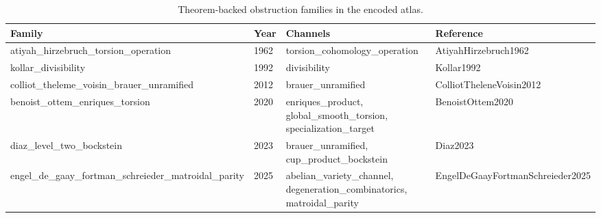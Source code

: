 \begin{table}[h]
\centering
\caption{Theorem-backed obstruction families in the encoded atlas.}
\label{tab:theorem-backed-family-summary}
\small
\renewcommand{\arraystretch}{1.18}
\begin{tabular}{|p{}|p{}|p{}|p{}|}
\hline
\centering\textbf{Family} & \centering\textbf{Year} & \centering\textbf{Channels} & \centering\arraybackslash\textbf{Reference} \\
\hline
atiyah\_\allowbreak{}hirzebruch\_\allowbreak{}torsion\_\allowbreak{}operation & 1962 & torsion\_\allowbreak{}cohomology\_\allowbreak{}operation & AtiyahHirzebruch1962 \\
kollar\_\allowbreak{}divisibility & 1992 & divisibility & Kollar1992 \\
colliot\_\allowbreak{}theleme\_\allowbreak{}voisin\_\allowbreak{}brauer\_\allowbreak{}unramified & 2012 & brauer\_\allowbreak{}unramified & ColliotTheleneVoisin2012 \\
benoist\_\allowbreak{}ottem\_\allowbreak{}enriques\_\allowbreak{}torsion & 2020 & enriques\_\allowbreak{}product, global\_\allowbreak{}smooth\_\allowbreak{}torsion, specialization\_\allowbreak{}target & BenoistOttem2020 \\
diaz\_\allowbreak{}level\_\allowbreak{}two\_\allowbreak{}bockstein & 2023 & brauer\_\allowbreak{}unramified, cup\_\allowbreak{}product\_\allowbreak{}bockstein & Diaz2023 \\
engel\_\allowbreak{}de\_\allowbreak{}gaay\_\allowbreak{}fortman\_\allowbreak{}schreieder\_\allowbreak{}matroidal\_\allowbreak{}parity & 2025 & abelian\_\allowbreak{}variety\_\allowbreak{}channel, degeneration\_\allowbreak{}combinatorics, matroidal\_\allowbreak{}parity & EngelDeGaayFortmanSchreieder2025 \\
\hline
\end{tabular}
\end{table}
